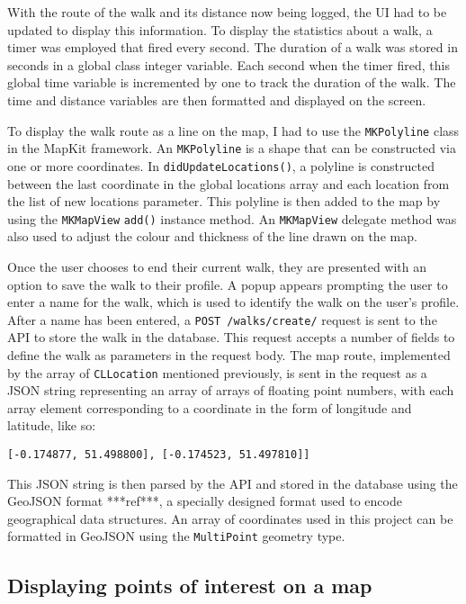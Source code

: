 With the route of the walk and its distance now being logged, the UI had to be updated to display this information. To display the statistics about a walk, a timer was employed that fired every second. The duration of a walk was stored in seconds in a global class integer variable. Each second when the timer fired, this global time variable is incremented by one to track the duration of the walk. The time and distance variables are then formatted and displayed on the screen.

To display the walk route as a line on the map, I had to use the \verb|MKPolyline| class in the MapKit framework. An \verb|MKPolyline| is a shape that can be constructed via one or more coordinates. In \verb|didUpdateLocations()|, a polyline is constructed between the last coordinate in the global locations array and each location from the list of new locations parameter. This polyline is then added to the map by using the \verb|MKMapView| \verb|add()| instance method. An \verb|MKMapView| delegate method was also used to adjust the colour and thickness of the line drawn on the map.


Once the user chooses to end their current walk, they are presented with an option to save the walk to their profile. A popup appears prompting the user to enter a name for the walk, which is used to identify the walk on the user's profile. After a name has been entered, a \verb|POST /walks/create/| request is sent to the API to store the walk in the database. This request accepts a number of fields to define the walk as parameters in the request body. The map route, implemented by the array of \verb|CLLocation| mentioned previously, is sent in the request as a JSON string representing an array of arrays of floating point numbers, with each array element corresponding to a coordinate in the form of longitude and latitude, like so:

\begin{center}
  \verb|[-0.174877, 51.498800], [-0.174523, 51.497810]]|
\end{center}

This JSON string is then parsed by the API and stored in the database using the GeoJSON format ***ref***, a specially designed format used to encode geographical data structures. An array of coordinates used in this project can be formatted in GeoJSON using the \verb|MultiPoint| geometry type.

\subsection{Displaying points of interest on a map}

